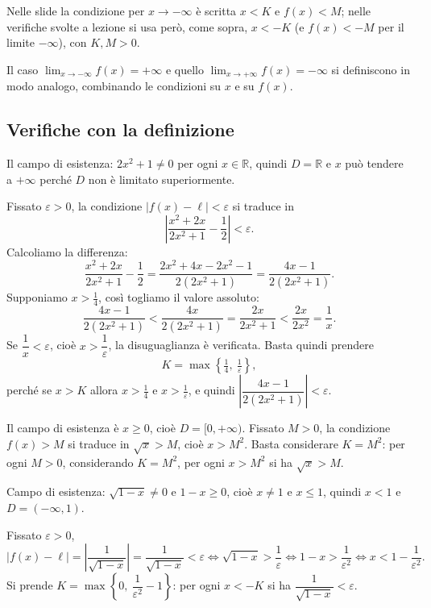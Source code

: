 \documentclass[11pt,a4paper]{article}
\begin{document}
\begin{osservazione}
Nelle slide la condizione per $x \to -\infty$ è scritta $x < K$ e $f(x) < M$; nelle verifiche svolte a lezione si usa però, come sopra, $x < -K$ (e $f(x) < -M$ per il limite $-\infty$), con $K, M > 0$.
\end{osservazione}

Il caso $\lim_{x\to-\infty} f(x) = +\infty$ e quello $\lim_{x\to+\infty} f(x) = -\infty$ si definiscono in modo analogo, combinando le condizioni su $x$ e su $f(x)$.

\subsection{Verifiche con la definizione}

\begin{esempio}[$\lim_{x\to+\infty}\frac{x^2+2x}{2x^2+1} = \frac{1}{2}$]
Il campo di esistenza: $2x^2 + 1 \neq 0$ per ogni $x \in \mathbb{R}$, quindi $D = \mathbb{R}$ e $x$ può tendere a $+\infty$ perché $D$ non è limitato superiormente.

Fissato $\varepsilon > 0$, la condizione $|f(x) - \ell| < \varepsilon$ si traduce in
\[
\left| \frac{x^2 + 2x}{2x^2 + 1} - \frac{1}{2} \right| < \varepsilon .
\]
Calcoliamo la differenza:
\[
\frac{x^2 + 2x}{2x^2 + 1} - \frac{1}{2} = \frac{2x^2 + 4x - 2x^2 - 1}{2(2x^2 + 1)} = \frac{4x - 1}{2(2x^2 + 1)} .
\]
Supponiamo $x > \tfrac{1}{4}$, così togliamo il valore assoluto:
\[
\frac{4x - 1}{2(2x^2 + 1)} < \frac{4x}{2(2x^2 + 1)} = \frac{2x}{2x^2 + 1} < \frac{2x}{2x^2} = \frac{1}{x} .
\]
Se $\dfrac{1}{x} < \varepsilon$, cioè $x > \dfrac{1}{\varepsilon}$, la disuguaglianza è verificata. Basta quindi prendere
\[
K = \max\left\{ \tfrac{1}{4},\ \tfrac{1}{\varepsilon} \right\},
\]
perché se $x > K$ allora $x > \tfrac{1}{4}$ e $x > \tfrac{1}{\varepsilon}$, e quindi $\left|\dfrac{4x-1}{2(2x^2+1)}\right| < \varepsilon$.
\end{esempio}

\begin{esempio}[$\lim_{x\to+\infty}\sqrt{x} = +\infty$]
Il campo di esistenza è $x \ge 0$, cioè $D = [0, +\infty)$. Fissato $M > 0$, la condizione $f(x) > M$ si traduce in $\sqrt{x} > M$, cioè $x > M^2$. Basta considerare $K = M^2$: per ogni $M > 0$, considerando $K = M^2$, per ogni $x > M^2$ si ha $\sqrt{x} > M$.
\end{esempio}

\begin{esempio}[$\lim_{x\to-\infty}\frac{1}{\sqrt{1-x}} = 0$]
Campo di esistenza: $\sqrt{1-x} \neq 0$ e $1 - x \ge 0$, cioè $x \ne 1$ e $x \le 1$, quindi $x < 1$ e $D = (-\infty, 1)$.

Fissato $\varepsilon > 0$,
\[
|f(x) - \ell| = \left| \frac{1}{\sqrt{1-x}} \right| = \frac{1}{\sqrt{1-x}} < \varepsilon
\iff \sqrt{1-x} > \frac{1}{\varepsilon}
\iff 1 - x > \frac{1}{\varepsilon^2}
\iff x < 1 - \frac{1}{\varepsilon^2} .
\]
Si prende $K = \max\left\{0,\ \dfrac{1}{\varepsilon^2} - 1\right\}$: per ogni $x < -K$ si ha $\dfrac{1}{\sqrt{1-x}} < \varepsilon$.
\end{esempio}
\end{document}
